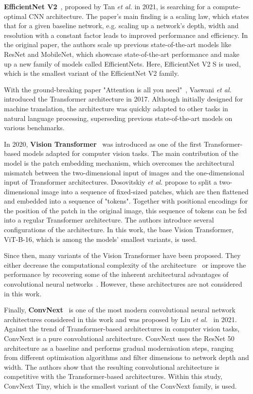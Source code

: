 \documentclass[a4paper]{article}
\begin{document}
\textbf{EfficientNet V2}~\cite{efficientnetv2}, proposed by Tan \textit{et al.}
in 2021, is searching for a compute-optimal CNN architecture. The paper's main
finding is a scaling law, which states that for a given baseline network, e.g.
scaling up a network's depth, width and resolution with a constant factor leads
to improved performance and efficiency. In the original paper, the authors scale
up previous state-of-the-art models like ResNet and MobileNet, which showcase
state-of-the-art performance and make up a new family of models called
EfficientNets. Here, EfficientNet V2 S is used, which is the smallest variant of
the EfficientNet V2 family.

With the ground-breaking paper "Attention is all you need"~\cite{transformer},
Vaswani \textit{et al.} introduced the Transformer architecture in 2017.
Although initially designed for machine translation, the architecture was
quickly adapted to other tasks in natural language processing,
superseding previous state-of-the-art models on various benchmarks. 

In 2020, \textbf{Vision Transformer}~\cite{vit} was introduced as one of the
first Transformer-based models adapted for computer vision tasks. The main
contribution of the model is the patch embedding mechanism, which overcomes the
architectural mismatch between the two-dimensional input of images and the
one-dimensional input of Transformer architectures. Dosovitskiy \textit{et al.}
propose to split a two-dimensional image into a sequence of fixed-sized patches,
which are then flattened and embedded into a sequence of "tokens". Together with
positional encodings for the position of the patch in the original image, this
sequence of tokens can be fed into a regular Transformer architecture. The
authors introduce several configurations of the architecture. In this work, the
base Vision Transformer, ViT-B-16, which is among the models' smallest variants,
is used.

Since then, many variants of the Vision Transformer have been proposed. They
either decrease the computational complexity of the architecture~\cite{deit,
vitlite} or improve the performance by recovering some of the inherent
architectural advantages of convolutional neural networks~\cite{swin}. However,
these architectures are not considered in this work.

Finally, \textbf{ConvNext}~\cite{convnext} is one of the most modern
convolutional neural network architectures considered in this work and was
proposed by Liu \textit{et al.}~\cite{convnext} in 2021. Against the trend of
Transformer-based architectures in computer vision tasks, ConvNext is a pure
convolutional architecture. ConvNext uses the ResNet 50~\cite{resnet}
architecture as a baseline and performs gradual modernisation steps, ranging
from different optimisation algorithms and filter dimensions to network depth
and width. The authors show that the resulting convolutional architecture is
competitive with the Transformer-based architectures. Within this study,
ConvNext Tiny, which is the smallest variant of the ConvNext family, is used.
\end{document}
